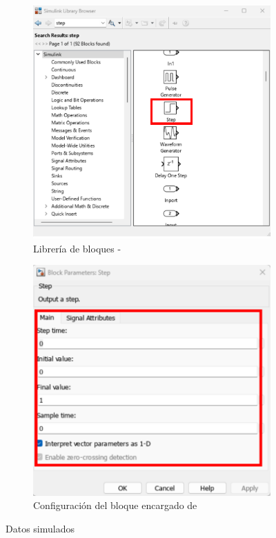 \begin{figure}[htbp]
    \centering
    \begin{subfigure}[b]{0.35\textwidth}
        \centering
        \includegraphics[width=\textwidth]{fig/Capitulo5/Caso_de_estudio_PID/lib_step.pdf}
        \caption{Librería de bloques -}
        \label{fig:bias_sim}
    \end{subfigure}
    \hfill
    \begin{subfigure}[b]{0.45\textwidth}
        \centering
        \includegraphics[width=\textwidth]{fig/Capitulo5/Caso_de_estudio_PID/config_step.pdf}
        \caption{Configuración del bloque encargado de }
        \label{fig:oe_sim}
    \end{subfigure}
    \caption{Datos simulados}
    \label{fig:data_simulated}
\end{figure}

